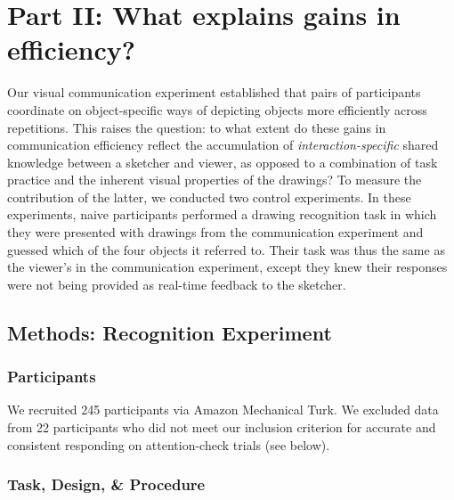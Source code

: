 \documentclass[10pt,letterpaper]{article}
\begin{document}

\section{Part II: What explains gains in efficiency?}

Our visual communication experiment established that pairs of participants coordinate on object-specific ways of depicting objects more efficiently across repetitions.
This raises the question: to what extent do these gains in communication efficiency reflect the accumulation of \emph{interaction-specific} shared knowledge between a sketcher and viewer, as opposed to a combination of task practice and the inherent visual properties of the drawings?
To measure the contribution of the latter, we conducted two control experiments.
In these experiments, naive participants performed a drawing recognition task in which they were presented with drawings from the communication experiment and guessed which of the four objects it referred to.
Their task was thus the same as the viewer's in the communication experiment, except they knew their responses were not being provided as real-time feedback to the sketcher.


\subsection{Methods: Recognition Experiment}

\subsubsection{Participants}

We recruited 245 participants via Amazon Mechanical Turk. 
We excluded data from 22 participants who did not meet our inclusion criterion for accurate and consistent responding on attention-check trials (see below).

\subsubsection{Task, Design, \& Procedure}
\end{document}
